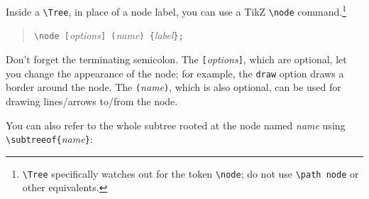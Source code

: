 \documentclass{article}
\begin{document}
Inside a \verb|\Tree|, in place of a node label, you can use a TikZ
\verb|\node| command.\footnote{\verb|\Tree| specifically watches out
for the token \verb|\node|; do not use \verb|\path node| or other
equivalents.}
\begin{quote}
\verb|\node [|\textit{options}\verb|] (|\textit{name}\verb|) {|\textit{label}\verb|};|
\end{quote}
Don't forget the terminating semicolon. The
\verb|[|\textit{options}\verb|]|, which are optional, let you change
the appearance of the node; for example, the \verb|draw| option draws
a border around the node. The \verb|(|\textit{name}\verb|)|, which is
also optional, can be used for drawing lines/arrows to/from the node.
\begin{center}
\begin{Example}
\end{Example}
\end{center}

You can also refer to the whole subtree rooted at the node named \textit{name}\/ using \verb|\subtreeof{|\textit{name}\verb|}|:
\begin{center}
\begin{SideBySideExample}
\end{SideBySideExample}
\end{center}
\end{document}
